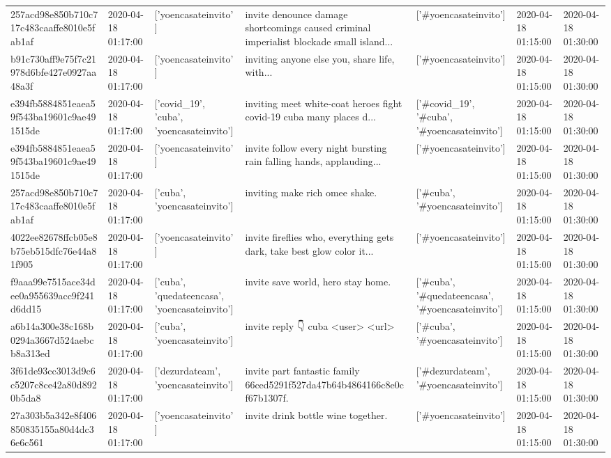 \begin{tabular}{lllllll}
257acd98e850b710c717c483caaffe8010e5fab1af & 2020-04-18 01:17:00 & ['yoencasateinvito'] & invite denounce damage shortcomings caused criminal imperialist blockade small island... & ['#yoencasateinvito'] & 2020-04-18 01:15:00 & 2020-04-18 01:30:00 \\
b91c730aff9e75f7c21978d6bfe427e0927aa48a3f & 2020-04-18 01:17:00 & ['yoencasateinvito'] & inviting anyone else you, share life, with... & ['#yoencasateinvito'] & 2020-04-18 01:15:00 & 2020-04-18 01:30:00 \\
e394fb5884851eaea59f543ba19601c9ae491515de & 2020-04-18 01:17:00 & ['covid_19', 'cuba', 'yoencasateinvito'] & inviting meet white-coat heroes fight covid-19 cuba many places d... & ['#covid_19', '#cuba', '#yoencasateinvito'] & 2020-04-18 01:15:00 & 2020-04-18 01:30:00 \\
e394fb5884851eaea59f543ba19601c9ae491515de & 2020-04-18 01:17:00 & ['yoencasateinvito'] & invite follow every night bursting rain falling hands, applauding... & ['#yoencasateinvito'] & 2020-04-18 01:15:00 & 2020-04-18 01:30:00 \\
257acd98e850b710c717c483caaffe8010e5fab1af & 2020-04-18 01:17:00 & ['cuba', 'yoencasateinvito'] & inviting make rich omee shake. & ['#cuba', '#yoencasateinvito'] & 2020-04-18 01:15:00 & 2020-04-18 01:30:00 \\
4022ee82678ffcb05e8b75eb515dfc76e44a81f905 & 2020-04-18 01:17:00 & ['yoencasateinvito'] & invite fireflies who, everything gets dark, take best glow color it... & ['#yoencasateinvito'] & 2020-04-18 01:15:00 & 2020-04-18 01:30:00 \\
f9aaa99e7515ace34dee0a955639acc9f241d6dd15 & 2020-04-18 01:17:00 & ['cuba', 'quedateencasa', 'yoencasateinvito'] & invite save world, hero stay home. & ['#cuba', '#quedateencasa', '#yoencasateinvito'] & 2020-04-18 01:15:00 & 2020-04-18 01:30:00 \\
a6b14a300e38c168b0294a3667d524aebcb8a313ed & 2020-04-18 01:17:00 & ['cuba', 'yoencasateinvito'] & invite reply 👇 cuba <user> <url> & ['#cuba', '#yoencasateinvito'] & 2020-04-18 01:15:00 & 2020-04-18 01:30:00 \\
3f61de93cc3013d9c6c5207c8ce42a80d8920b5da8 & 2020-04-18 01:17:00 & ['dezurdateam', 'yoencasateinvito'] & invite part fantastic family 66ced5291f527da47b64b4864166c8e0cf67b1307f. & ['#dezurdateam', '#yoencasateinvito'] & 2020-04-18 01:15:00 & 2020-04-18 01:30:00 \\
27a303b5a342e8f406850835155a80d4dc36e6c561 & 2020-04-18 01:17:00 & ['yoencasateinvito'] & invite drink bottle wine together. & ['#yoencasateinvito'] & 2020-04-18 01:15:00 & 2020-04-18 01:30:00 \\

\end{tabular}
